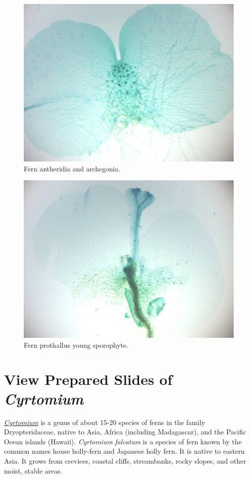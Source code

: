 \begin{figure}

{\centering \includegraphics[width=0.7\linewidth]{./figures/mosses/fern_antheridia_archegonia}

}

\caption{Fern antheridia and archegonia.}\label{fig:ferngametophyte}
\end{figure}

\begin{figure}

{\centering \includegraphics[width=0.7\linewidth]{./figures/mosses/fern_prothallus}

}

\caption{Fern prothallus young sporophyte.}\label{fig:fernprothallus}
\end{figure}

\section{View Prepared Slides of
\emph{Cyrtomium}}\label{view-prepared-slides-of-cyrtomium}

\href{https://en.wikipedia.org/wiki/Cyrtomium}{\emph{Cyrtomium}} is a
genus of about 15-20 species of ferns in the family Dryopteridaceae,
native to Asia, Africa (including Madagascar), and the Pacific Ocean
islands (Hawaii). \emph{Cyrtomium falcatum} is a species of fern known by the
common names house holly-fern and Japanese holly fern. It is native to
eastern Asia. It grows from crevices, coastal cliffs, streambanks, rocky
slopes, and other moist, stable areas.

